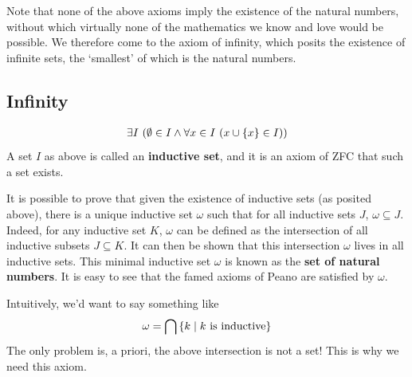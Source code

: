 Note that none of the above axioms imply the existence of the natural numbers, without which virtually none of the mathematics we know and love would be possible. We therefore come to the axiom of infinity, which posits the existence of infinite sets, the `smallest' of which is the natural numbers.

\subsection{Infinity}

\begin{baxiom}\label{ZFC:Infty}
    \hfill
    \begin{align*}
        \exists I \, \left( \emptyset \in I \land \forall x \in I \, \left( x \cup \left\{ x \right\} \in I \right) \right)
    \end{align*}
    A set $I$ as above is called an \textbf{inductive set}, and it is an axiom of ZFC that such a set exists.
\end{baxiom}

It is possible to prove that given the existence of inductive sets (as posited above), there is a unique inductive set $\omega$ such that for all inductive sets $J$, $\omega \subseteq J$. Indeed, for any inductive set $K$, $\omega$ can be defined as the intersection of all inductive subsets $J \subseteq K$. It can then be shown that this intersection $\omega$ lives in all inductive sets. This minimal inductive set $\omega$ is known as the \textbf{set of natural numbers}. It is easy to see that the famed axioms of Peano are satisfied by $\omega$.

Intuitively, we'd want to say something like
\begin{align*}
    \omega = \bigcap \left\{ k \; \middle\vert \; k \text{ is inductive} \right\}
\end{align*}
The only problem is, a priori, the above intersection is not a set! This is why we need this axiom.
